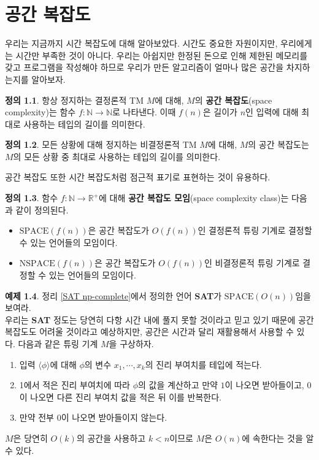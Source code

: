 \documentclass[b5paper, 10pt]{book}
\theoremstyle{definition}
\newtheorem{defn}{정의}[chapter]
\newtheorem{ex}[defn]{예제}
\begin{document}
\chapter{공간 복잡도}
우리는 지금까지 시간 복잡도에 대해 알아보았다. 시간도 중요한 자원이지만, 우리에게는 시간만 부족한 것이 아니다.
우리는 아쉽지만 한정된 돈으로 인해 제한된 메모리를 갖고 프로그램을 작성해야 하므로 우리가 만든 알고리즘이 얼마나
많은 공간을 차지하는지를 알아보자.
\begin{defn}
    항상 정지하는 결정론적 TM $M$에 대해, $M$의 \textbf{공간 복잡도}(space complexity)는
    함수 $f: \mathbb{N} \rightarrow \mathbb{N}$로 나타낸다. 이때 $f(n)$은 길이가 $n$인 입력에
    대해 최대로 사용하는 테입의 길이를 의미한다. 
\end{defn}
\begin{defn}
    모든 상황에 대해 정지하는 비결정론적 TM $M$에 대해, $M$의 공간 복잡도는 $M$의 모든 상황 중
    최대로 사용하는 테입의 길이를 의미한다.
\end{defn}
공간 복잡도 또한 시간 복잡도처럼 점근적 표기로 표현하는 것이 유용하다.
\begin{defn}
    함수 $f : \mathbb{N} \rightarrow \mathbb{R}^+$에 대해 
    \textbf{공간 복잡도 모임}(space complexity class)는 다음과 같이
    정의된다.
    \begin{itemize}
        \item $\text{SPACE}(f(n))$은 공간 복잡도가 $O(f(n))$인 
        결정론적 튜링 기계로 결정할 수 있는 언어들의 모임이다.
        \item $\text{NSPACE}(f(n))$은 공간 복잡도가 $O(f(n))$인
        비결정론적 튜링 기계로 결정할 수 있는 언어들의 모임이다.
    \end{itemize}
\end{defn} 
\begin{ex}
    정리 \ref{SAT np-complete}에서 정의한 언어 \textbf{SAT}가 
    $\text{SPACE}(O(n))$임을 보여라. \\ 
    우리는 \textbf{SAT} 정도는 당연히 다항 시간 내에 풀지 못할 것이라고 믿고
    있기 때문에 공간 복잡도도 어려울 것이라고 예상하지만, 공간은 시간과 달리 
    재활용해서 사용할 수 있다. 다음과 같은 튜링 기계 $M$을 구상하자. 
    \begin{enumerate}
        \item 입력 $\langle \phi \rangle$에 대해 $\phi$의 변수 
        $x_1, \cdots, x_k$의 진리 부여치를 테입에 적는다. 
        \item 1에서 적은 진리 부여치에 따라 $\phi$의 값을 계산하고
        만약 $1$이 나오면 받아들이고, 0이 나오면 다른 진리 부여치 값을
        적은 뒤 이를 반복한다.
        \item 만약 전부 0이 나오면 받아들이지 않는다.
    \end{enumerate}
    $M$은 당연히 $O(k)$의 공간을 사용하고 $k<n$이므로 $M$은 $O(n)$에 
    속한다는 것을 알 수 있다.
\end{ex}
\end{document}
